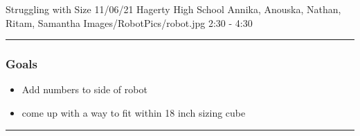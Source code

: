\insertmeeting 
	{Struggling with Size} 
	{11/06/21}
	{Hagerty High School}
	{Annika, Anouska, Nathan, Ritam, Samantha}
	{Images/RobotPics/robot.jpg}
	{2:30 - 4:30}
	
\noindent\hfil\rule{\textwidth}{.4pt}\hfil
\subsubsection*{Goals}
\begin{itemize}
    \item Add numbers to side of robot
    \item come up with a way to fit within 18 inch sizing cube


\end{itemize} 

\noindent\hfil\rule{\textwidth}{.4pt}\hfil

